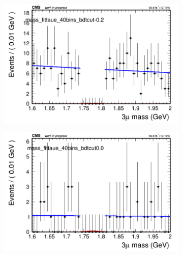 \begin{figure}[H]
\begin{subfigure}{0.2\textwidth}
        \caption{}
    \end{subfigure}
    \begin{subfigure}{0.2\textwidth}
        \includegraphics[width=\textwidth]{unfixed_exp/plots/taue/massfit_taue_40bins_bdtcut-0.2.png}
        \caption{}
    \end{subfigure}
    \begin{subfigure}{0.2\textwidth}
        \includegraphics[width=\textwidth]{unfixed_exp/plots/taue/massfit_taue_40bins_bdtcut0.0.png}
        \caption{}
    \end{subfigure}
    \begin{subfigure}{0.2\textwidth}

\end{subfigure}
\end{figure}
